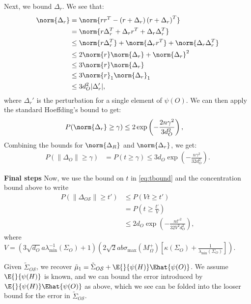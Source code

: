 \documentclass[letterpaper]{article}
\begin{document}
\begin{appendix}
Next, we bound $\Delta_r$.
We see that:
\begin{align*}
	\norm{ \Delta_r }
	&=
	\norm{ 
		rr^T 
		- \left( r + \Delta_r \right) \left( r + \Delta_r \right)^T 
	}\\
	&=
	\norm{ 
		r\Delta_r^T + \Delta_rr^T + \Delta_r\Delta_r^T
	}\\
	&\leq
	\norm{ r\Delta_r^T } 
	+ \norm{ \Delta_rr^T } 
	+ \norm{ \Delta_r\Delta_r^T }\\
	&\leq
	2\norm{r} \norm{\Delta_r}
	+ \norm{ \Delta_r }^2\\
	&\leq
	3 \norm{r} \norm{\Delta_r}\\
	&\leq
	3 \norm{r}_1 \norm{\Delta_r}_1\\
	&\leq
	3 d_O^2 | \Delta_r' |,
\end{align*}
where $\Delta_r'$ is the perturbation for a single element of $\psi(O)$.
We can then apply the standard Hoeffding's bound to get:
\begin{align*}
	P(\norm{ \Delta_r } \geq \gamma)
	&\leq
	2\exp\left( -\frac{ 2n\gamma^2 }{3d_O^2} \right),
\end{align*}
Combining the bounds for $\norm{\Delta_R}$ and $\norm{\Delta_r}$, we get:
\begin{align}
	P(\|\Delta_O\| \geq \gamma)
	&=
	P(t \geq \gamma)
	\leq
	3d_O \exp \left( -\frac{n\gamma^2}{32d_O^2} \right).
\end{align}
 
{\bf Final steps} 
Now, we use the bound on $t$ in \eqref{eq:tbound} and the concentration bound above to write
 \begin{align*} 
 P(\|\Delta_{O\mathcal{S}}\| \geq t') &\leq P(Vt \geq t') \\
 &= P\left(t \geq \frac{t'}{V} \right) \\
& \leq  2d_O \exp \left( -\frac{nt'^2}{32V^2d_O^2} \right),
 \end{align*}
 where $V= (3\sqrt{d_O}a \lambda_{\min}^{-1}(\Sigma_O)+1)\left(2\sqrt{2}ab \sigma_{\max}(M_\Omega^+) \left[ \kappa(\Sigma_O)   +\frac{1}{  \lambda_{\min}(\Sigma_O)}\right] \right)$.

Given $\tilde{\Sigma}_{O\mathcal{S}}$, we recover $\tilde{\mu}_1 = \tilde{\Sigma}_{O\mathcal{S}} + \E{}{\psi(H)}\Ehat{\psi(O)}$.
We assume $\E{}{\psi(H)}$ is known, and we can bound the error introduced by $\E{}{\psi(H)}\Ehat{\psi(O)}$ as above, which we see can be folded into the looser bound for the error in $\tilde{\Sigma}_{O\mathcal{S}}$.


\end{appendix}
\end{document}
